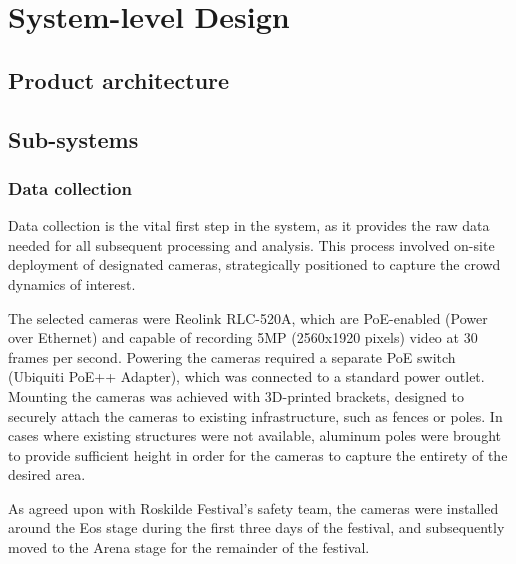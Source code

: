 \chapter{System-level Design}
\label{chap:system-level-design}

\section{Product architecture}


\section{Sub-systems}

\subsection{Data collection}



Data collection is the vital first step in the system, as it provides the raw data needed for all subsequent processing and analysis. This process involved on-site deployment of designated cameras, strategically positioned to capture the crowd dynamics of interest.

The selected cameras were Reolink RLC-520A, which are PoE-enabled (Power over Ethernet) and capable of recording 5MP (2560x1920 pixels) video at 30 frames per second. Powering the cameras required a separate PoE switch (Ubiquiti PoE++ Adapter), which was connected to a standard power outlet. Mounting the cameras was achieved with 3D-printed brackets, designed to securely attach the cameras to existing infrastructure, such as fences or poles. In cases where existing structures were not available, aluminum poles were brought to provide sufficient height in order for the cameras to capture the entirety of the desired area.

As agreed upon with Roskilde Festival's safety team, the cameras were installed around the Eos stage during the first three days of the festival, and subsequently moved to the Arena stage for the remainder of the festival.

